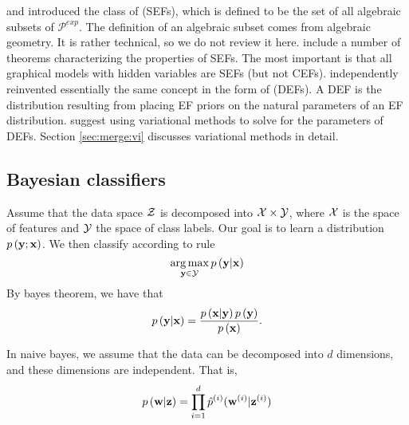 \documentclass[thesis.tex]{subfiles}
\newcommand{\p}[1]{p\left({#1}\right)}
\newcommand{\psup}[2]{\hat p^{#1}({#2})}
\newcommand{\Pdist}{\mathcal P}
\newcommand{\Pexp}{\Pdist^\textit{exp}}
\begin{document}

\cite{geiger1998graphical} and \citet{geiger2001stratified} introduced the class of  (SEFs),
which is defined to be the set of all algebraic subsets of $\Pexp$.
The definition of an algebraic subset comes from algebraic geometry.
It is rather technical, so we do not review it here.
\citet{geiger2001stratified} include a number of theorems characterizing the properties of SEFs.
The most important is that all graphical models with hidden variables are SEFs (but not CEFs).
\cite{ranganath2015deep} independently reinvented essentially the same concept in the form of  (DEFs).
A DEF is the distribution resulting from placing EF priors on the natural parameters of an EF distribution.
\citet{ranganath2015deep} suggest using variational methods to solve for the parameters of DEFs.
Section \ref{sec:merge:vi} discusses variational methods in detail.


\subsection{Bayesian classifiers}

Assume that the data space ${\mathcal Z}$ is decomposed into ${\mathcal X}\times {\mathcal Y}$,
where ${\mathcal X}$ is the space of features and ${\mathcal Y}$ the space of class labels.
Our goal is to learn a distribution $\p{\y ; \x}$.
We then classify according to rule
\begin{equation}
    \argmax_{\y\in\Y} \p{\y | \x}
    \end{equation}
By bayes theorem, we have that
\begin{equation}
    \p{\y | \x} = \frac{\p{\x | \y}\p{\y}}{\p{\x}}
    .
\end{equation}

In naive bayes, we assume that the data can be decomposed into $d$ dimensions,
and these dimensions are independent.
That is,
\begin{equation}
    \p{\w | \z} = \prod_{i=1}^d \psup{(i)}{\w^{(i)} | \z^{(i)}}
\end{equation}
\end{document}
